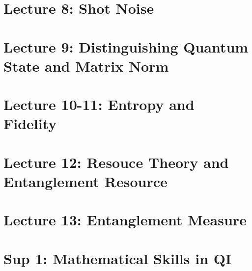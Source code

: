 \documentclass[10pt]{article}
\begin{document}
\newpage
\section{Lecture 8: Shot Noise}\label{sec:Lecture 8: Shot Noice} %


\newpage
\section{Lecture 9: Distinguishing Quantum State and Matrix
Norm}\label{sec:Lecture 9:} %


\newpage
\section{Lecture 10-11: Entropy and Fidelity}\label{sec:Lecture 10:
Entropy} %


\newpage
\section{Lecture 12: Resouce Theory and Entanglement
Resource}\label{sec:Lecture 11: Resouce Theory and Entanglement
Resource} %


\newpage
\section{Lecture 13: Entanglement Measure}\label{sec:Lecture
12:Entanglement Measure} %


\newpage
\section{Sup 1: Mathematical Skills in QI}\label{sec:Sup 1:
QI之中常用的数学技巧} %

\end{document}
